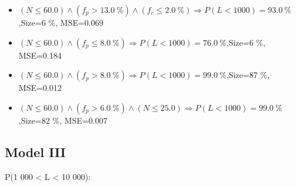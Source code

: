 \documentclass[numbered]{CSL}
\begin{document}
\begin{itemize}
\item $(N \leq 60.0) \land (f_p > 13.0~\%) \land (f_c \leq 2.0~\%) \Rightarrow P(L < 1 000) = 93.0~\%$,\hfill Size=6 \%, MSE=0.069
\item $(N \leq 60.0) \land (f_p \leq 8.0~\%) \Rightarrow P(L < 1 000) = 76.0~\%$,\hfill Size=6 \%, MSE=0.184
\item $(N \leq 60.0) \land (f_p > 8.0~\%) \Rightarrow P(L < 1 000) = 99.0~\%$,\hfill Size=87 \%, MSE=0.012
\item $(N \leq 60.0) \land (f_p > 6.0~\%) \land (N \leq 25.0) \Rightarrow P(L < 1 000) = 99.0~\%$,\hfill Size=82 \%, MSE=0.007
\end{itemize}

\subsection{Model III}
P(1 000 < L < 10 000):
\end{document}
